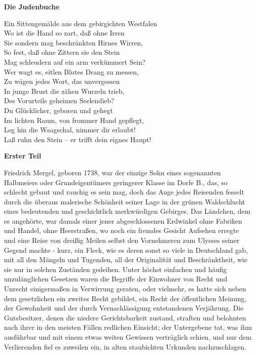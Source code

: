 \textbf{Die Judenbuche}\bigskip

\begin{center}
Ein Sittengemälde aus dem gebirgichten Westfalen\\
Wo ist die Hand so zart, daß ohne Irren\\
Sie sondern mag beschränkten Hirnes Wirren,\\
So fest, daß ohne Zittern sie den Stein\\
Mag schleudern auf ein arm verkümmert Sein?\\
Wer wagt es, eitlen Blutes Drang zu messen,\\
Zu wägen jedes Wort, das unvergessen\\
In junge Brust die zähen Wurzeln trieb,\\
Des Vorurteils geheimen Seelendieb?\\
Du Glücklicher, geboren und gehegt\\
Im lichten Raum, von frommer Hand gepflegt,\\
Leg hin die Waagschal, nimmer dir erlaubt!\\
Laß ruhn den Stein – er trifft dein eignes Haupt!
\end{center}


\textbf{Erster Teil}\bigskip

Friedrich Mergel, geboren 1738, war der einzige Sohn eines sogenannten Halbmeiers oder Grundeigentümers geringerer Klasse im Dorfe B., das, so schlecht gebaut und rauchig es sein mag, doch das Auge jedes Reisenden fesselt durch die überaus malerische Schönheit seiner Lage in der grünen Waldschlucht eines bedeutenden und geschichtlich merkwürdigen Gebirges. Das Ländchen, dem es angehörte, war damals einer jener abgeschlossenen Erdwinkel ohne Fabriken und Handel, ohne Heerstraßen, wo noch ein fremdes Gesicht Aufsehen erregte und eine Reise von dreißig Meilen selbst den Vornehmeren zum Ulysses seiner Gegend machte - kurz, ein Fleck, wie es deren sonst so viele in Deutschland gab, mit all den Mängeln und Tugenden, all der Originalität und Beschränktheit, wie sie nur in solchen Zuständen gedeihen. Unter höchst einfachen und häufig unzulänglichen Gesetzen waren die Begriffe der Einwohner von Recht und Unrecht einigermaßen in Verwirrung geraten, oder vielmehr, es hatte sich neben dem gesetzlichen ein zweites Recht gebildet, ein Recht der öffentlichen Meinung, der Gewohnheit und der durch Vernachlässigung entstandenen Verjährung. Die Gutsbesitzer, denen die niedere Gerichtsbarkeit zustand, straften und belohnten nach ihrer in den meisten Fällen redlichen Einsicht; der Untergebene tat, was ihm ausführbar und mit einem etwas weiten Gewissen verträglich schien, und nur dem Verlierenden fiel es zuweilen ein, in alten staubichten Urkunden nachzuschlagen.


